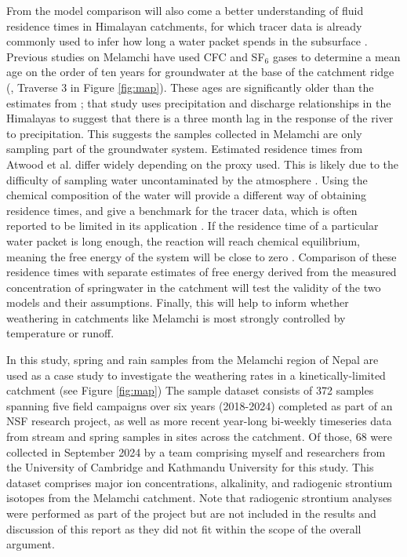 From the model comparison will also come a better understanding of fluid residence times in Himalayan catchments, for which tracer data is already commonly used to infer how long a water packet spends in the subsurface \parencite{atwoodCriticalZoneResponse2023}. Previous studies on Melamchi have used CFC and SF$_6$ gases to determine a mean age on the order of ten years for groundwater at the base of the catchment ridge (\cite{atwoodCriticalZoneResponse2023}, Traverse 3 in Figure \ref{fig:map}). These ages are significantly older than the estimates from \cite{andermannImpactTransientGroundwater2012}; that study uses precipitation and discharge relationships in the Himalayas to suggest that there is a three month lag in the response of the river to precipitation. This suggests the samples collected in Melamchi are only sampling part of the groundwater system. Estimated residence times from Atwood et al. differ widely depending on the proxy used. This is likely due to the difficulty of sampling water uncontaminated by the atmosphere \parencite{mccallumLimitationsUseEnvironmental2015}. Using the chemical composition of the water will provide a different way of obtaining residence times, and give a benchmark for the tracer data, which is often reported to be limited in its application \parencite{mccallumLimitationsUseEnvironmental2015}. If the residence time of a particular water packet is long enough, the reaction will reach chemical equilibrium, meaning the free energy of the system will be close to zero \parencite{kampmanFeldsparDissolutionKinetics2009}. Comparison of these residence times with separate estimates of free energy derived from the measured concentration of springwater in the catchment will test the validity of the two models and their assumptions. Finally, this will help to inform whether weathering in catchments like Melamchi is most strongly controlled by temperature or runoff.


\bsk

In this study, spring and rain samples from the Melamchi region of Nepal are used as a case study to investigate the weathering rates in a kinetically-limited catchment (see Figure \ref{fig:map}) The sample dataset consists of 372 samples spanning five field campaigns over six years (2018-2024) completed as part of an NSF research project, as well as more recent year-long bi-weekly timeseries data from stream and spring samples in sites across the catchment. Of those, 68 were collected in September 2024 by a team comprising myself and researchers from the University of Cambridge and Kathmandu University for this study. This dataset comprises major ion concentrations, alkalinity, and radiogenic strontium isotopes from the Melamchi catchment. Note that radiogenic strontium analyses were performed as part of the project but are not included in the results and discussion of this report as they did not fit within the scope of the overall argument.


